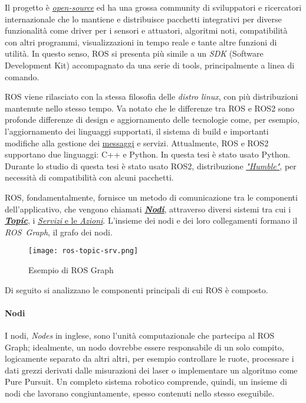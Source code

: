Il progetto è \href{https://github.com/ros}{\textit{open-source}} ed ha una grossa community di
sviluppatori e ricercatori internazionale che lo mantiene e distribuisce pacchetti integrativi per
diverse funzionalità come driver per i sensori e attuatori, algoritmi noti, compatibilità con altri
programmi, visualizzazioni in tempo reale e tante altre funzioni di utilità. In questo senso, ROS si
presenta più simile a un \textit{SDK} (Software Development Kit) accompagnato da una serie di tools,
principalmente a linea di comando.

ROS viene rilasciato con la stessa filosofia delle \textit{distro linux}, con più distribuzioni mantenute
nello stesso tempo. Va notato che le differenze tra ROS e ROS2 sono profonde differenze
di design e aggiornamento delle tecnologie come, per esempio, l'aggiornamento dei linguaggi supportati,
il sistema di build e importanti modifiche alla gestione dei \hyperref[ros:msgs]{messaggi} e servizi. \cite{ros-diff}
Attualmente, ROS e ROS2 supportano due linguaggi: C++ e Python. In questa tesi è stato usato Python.
Durante lo studio di questa tesi è stato usato ROS2, distribuzione
\href{https://docs.ros.org/en/humble/}{\textit{"Humble"}}, per necessità di compatibilità con alcuni
pacchetti.

\bigskip
\noindent ROS, fondamentalmente, fornisce un metodo di comunicazione tra le componenti dell'applicativo,
che vengono chiamati \hyperref[ros:nodes]{\textbf{\textit{Nodi}}}, attraverso diversi sistemi tra cui i
\hyperref[ros:topics]{\textbf{\textit{Topic}}}, i \hyperref[ros:srv-act]{\textit{Servizi} e le
\textit{Azioni}}. L'insieme dei nodi e dei loro collegamenti formano il \textit{ROS~Graph}, il grafo dei
nodi.

\medskip
\begin{figure}[h]
	\centering
	\texttt{[image: ros-topic-srv.png]}
	\caption{Esempio di ROS Graph \cite{lection01}}
	\label{fig:ros-topic-srv}
\end{figure}
\noindent Di seguito si analizzano le componenti principali di cui ROS è composto.
\paragraph{Nodi \cite{undr-nodes, ros-nodes}} 
\label{ros:nodes}
I nodi, \textit{Nodes} in inglese, sono l'unità computazionale che partecipa al ROS Graph;
idealmente, un nodo dovrebbe essere responsabile di un solo compito, logicamente separato
da altri altri, per esempio controllare le ruote, processare i dati grezzi derivati dalle misurazioni
dei laser o implementare un algoritmo come Pure Pursuit.
Un completo sistema robotico comprende, quindi, un insieme di nodi che lavorano congiuntamente, spesso
contenuti nello stesso eseguibile.\\

